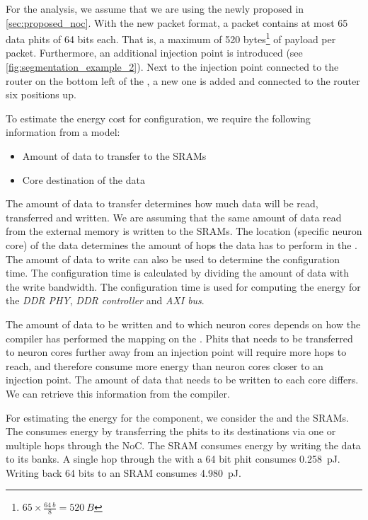 For the analysis, we assume that we are using the newly proposed \confignoc{} in \cref{sec:proposed_noc}. 
With the new packet format, a packet contains at most 65 data phits of 64 bits each.
That is, a maximum of 520 bytes\footnote{$65 \times \frac{\SI{64}{b}}{8} = \SI{520}{B}$} of payload per packet.
Furthermore, an additional injection point is introduced (see \cref{fig:segmentation_example_2}).
Next to the injection point connected to the router on the bottom left of the \confignoc{}, a new one is added and connected to the router six positions up.

To estimate the energy cost for configuration, we require the following information from a model:
\begin{itemize}
    \item Amount of data to transfer to the SRAMs
    \item Core destination of the data
\end{itemize}

The amount of data to transfer determines how much data will be read, transferred and written.
We are assuming that the same amount of data read from the external memory is written to the SRAMs.
The location (specific neuron core) of the data determines the amount of hops the data has to perform in the \confignoc{}.
The amount of data to write can also be used to determine the configuration time.
The configuration time is calculated by dividing the amount of data with the write bandwidth.
The configuration time is used for computing the energy for the \textit{DDR PHY}, \textit{DDR controller} and \textit{AXI bus}.

The amount of data to be written and to which neuron cores depends on how the compiler has performed the mapping on the \graicore{}. %
Phits that needs to be transferred to neuron cores further away from an injection point will require more hops to reach, and therefore consume more energy than neuron cores closer to an injection point.
The amount of data that needs to be written to each core differs.
We can retrieve this information from the compiler.

For estimating the energy for the \graicore{} component, we consider the \confignoc{} and the SRAMs.
The \confignoc{} consumes energy by transferring the phits to its destinations via one or multiple hops through the NoC.
The SRAM consumes energy by writing the data to its banks.
A single hop through the \confignoc{} with a 64 bit phit consumes \SI{0.258}{pJ}.
Writing back 64 bits to an SRAM consumes \SI{4.980}{pJ}.

